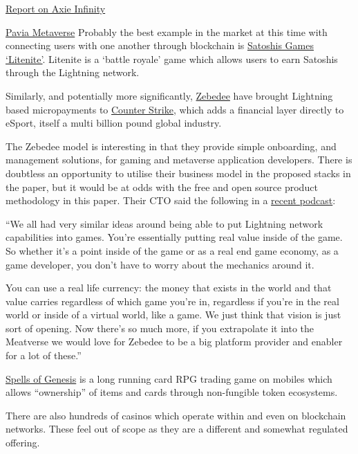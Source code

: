 \href{https://naavik.co/business-breakdowns/axie-infinity/#axie-decon=}{Report on Axie Infinity}

\href{https://www.thesun.co.uk/tech/17348918/pavia-metaverse-cardano-crypto-game/}{Pavia Metaverse}
Probably the best example in the market at this time with connecting users with one another through blockchain is \href{https://lightnite.io/}{Satoshis Games `Litenite'}. Litenite is a `battle royale' game which allows users to earn Satoshis through the Lightning network.\par
Similarly, and potentially more significantly, \href{https://twitter.com/zebedeeio/status/1512128093653196809}{Zebedee} have brought Lightning based micropayments to \href{https://zebedee.io/infuse/}{Counter Strike}, which adds a financial layer directly to eSport, itself a multi billion pound global industry.\par
The Zebedee model is interesting in that they provide simple onboarding, and management solutions, for gaming and metaverse application developers. There is doubtless an opportunity to utilise their business model in the proposed stacks in the paper, but it would be at odds with the free and open source product methodology in this paper. Their CTO said the following in a \href{https://lightningjunkies.net/lightning-address-making-lightning-user-friendly-lnj052/}{recent podcast}:\par
``We all had very similar ideas around being able to put Lightning network capabilities into games. You're essentially putting real value inside of the game. So whether it's a point inside of the game or as a real end game economy, as a game developer, you don't have to worry about the mechanics around it.\par
You can use a real life currency: the money that exists in the world and that value carries regardless of which game you're in, regardless if you're in the real world or inside of a virtual world, like a game. We just think that vision is just sort of opening. Now there's so much more, if you extrapolate it into the Meatverse we would love for Zebedee to be a big platform provider and enabler for a lot of these.''\par
\href{https://spellsofgenesis.com/}{Spells of Genesis} is a long running card RPG trading game on mobiles which allows ``ownership'' of items and cards through non-fungible token ecosystems.\par
There are also hundreds of casinos which operate within and even on blockchain networks. These feel out of scope as they are a different and somewhat regulated offering.
